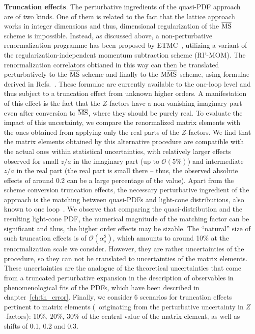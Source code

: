 \textbf{Truncation effects}. The perturbative ingredients of the quasi-PDF
approach are of two kinds. One of them is related to the fact that the lattice
approach works in integer dimensions and thus, dimensional regularization of the
$\overline{\mathrm{MS}}$ scheme is impossible. Instead, as discussed above, a non-perturbative
renormalization programme has been proposed by ETMC~\cite{Alexandrou:2017huk},
utilizing a variant of the regularization-independent momentum subtraction
scheme (RI'-MOM). The renormalization correlators obtianed in this way can then
be translated perturbatively to the $\overline{\mathrm{MS}}$ scheme and finally to the ${\rm M}\overline{\mathrm{MS}}$
scheme, using formulae derived in Refs.~\cite{Constantinou:2017sej,
Alexandrou:2019lfo}. These formulae are currently available to the one-loop
level and thus subject to a truncation effect from unknown higher orders. A
manifestation of this effect is the fact that the $Z$-factors have a
non-vanishing imaginary part even after conversion to $\overline{\mathrm{MS}}$, where they should
be purely real. To evaluate the impact of this uncertainty, we compare the
renormalized matrix elements with the ones obtained from applying only the real
parts of the $Z$-factors. We find that the matrix elements obtained by this
alternative procedure are compatible with the actual ones within statistical
uncertainties, with relatively larger effects observed for small $z/a$ in the
imaginary part (up to $\mathcal{O}(5\%)$) and intermediate $z/a$ in the real
part (the real part is small there -- thus, the observed absolute effects of
around 0.2 can be a large percentage of the value). Apart from the scheme
conversion truncation effects, the necessary perturbative ingredient of the
approach is the matching between quasi-PDFs and light-cone distributions, also
known to one loop~\cite{Xiong:2013bka,Izubuchi:2018srq,Alexandrou:2019lfo}.
We observe that comparing the quasi-distribution and the resulting light-cone PDF, the numerical
magnitude of the matching factor can be significant and thus, the higher order
effects may be sizable. The ``natural'' size of such truncation effects is of
$\mathcal{O}(\alpha_s^2)$, which amounts to around 10\% at the renormalization
scale we consider. However, they are rather uncertainties of the procedure, so
they can not be translated to uncertainties of the matrix elements. These
uncertainties are the analogue of the theoretical uncertainties that come from a
truncated perturbative expansion in the description of observables in
phenomenological fits of the PDFs, which have been described in chapter~\ref{ch:th_error}.
Finally, we consider 6 scenarios for truncation effects
pertinent to matrix elements (\ie\ originating from the perturbative uncertainty
in $Z$-factors): 10\%, 20\%, 30\% of the central value of the matrix element, as
well as shifts of 0.1, 0.2 and 0.3. 

